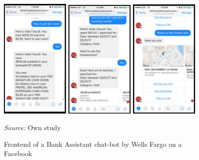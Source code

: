 \begin{figure}
    \centering
    \includegraphics[width=0.3\textwidth, keepaspectratio]{images/wells_fargo_bot_1.png}
    \includegraphics[width=0.3\textwidth, keepaspectratio]{images/wells_fargo_bot_2.png}
    \includegraphics[width=0.3\textwidth, keepaspectratio]{images/wells_fargo_bot_3.png}
    \caption{Frontend of a Bank Assistant chat-bot by Wells Fargo on a Facebook}
    \medskip
    \footnotesize\textit{Source:} Own study
\end{figure}

